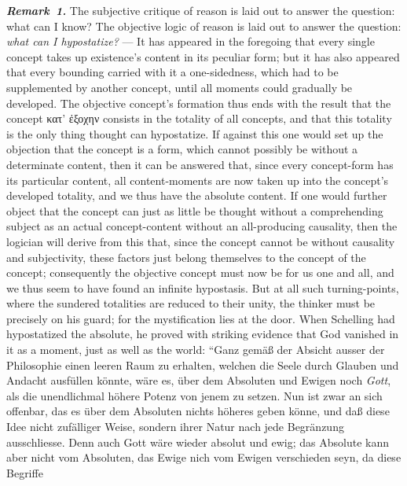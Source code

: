 \documentclass[12pt]{book}
\newcommand{\anm}[1]{\emph{\textbf{Remark~#1.}}}
\begin{document}
\anm{1} The subjective critique of reason is laid out to answer the
question: what can I know? The objective logic of reason is laid out to
answer the question: \emph{what can I hypostatize?} --- It has appeared in
the foregoing that every single concept takes up existence's content in its
peculiar form; but it has also appeared that every bounding carried with it
a one-sidedness, which had to be supplemented by another concept, until all
moments could gradually be developed. The objective concept's formation thus
ends with the result that the concept κατ' ἐξοχην consists in the totality
of all concepts, and that this totality is the only thing thought can
hypostatize. If against this one would set up the objection that the concept
is a form, which cannot possibly be without a determinate content, then it
can be answered that, since every concept-form has its particular content,
all content-moments are now taken up into the concept's developed totality,
and we thus have the absolute content. If one would further object that the
concept can just as little be thought without a comprehending subject as an
actual concept-content without an all-producing causality, then the logician
will derive from this that, since the concept cannot be without causality
and subjectivity, these factors just belong themselves to the concept of the
concept; consequently the objective concept must now be for us one and all,
and we thus seem to have found an infinite hypostasis. But at all such
turning-points, where the sundered totalities are reduced to their unity,
the thinker must be precisely on his guard; for the mystification lies at
the door. When Schelling had hypostatized the absolute, he proved with
striking evidence that God vanished in it as a moment, just as well as the
world: ``Ganz gemäß der Absicht ausser der Philosophie einen leeren Raum zu
erhalten, welchen die Seele durch Glauben und Andacht ausfüllen könnte, wäre
es, über dem Absoluten und Ewigen noch \emph{Gott}, als die unendlichmal
höhere Potenz von jenem zu setzen. Nun ist zwar an sich offenbar, das es
über dem Absoluten nichts höheres geben könne, und daß diese Idee nicht
zufälliger Weise, sondern ihrer Natur nach jede Begränzung ausschliesse.
Denn auch Gott wäre wieder absolut und ewig; das Absolute kann aber nicht
vom Absoluten, das Ewige nich vom Ewigen verschieden seyn, da diese Begriffe
\end{document}

